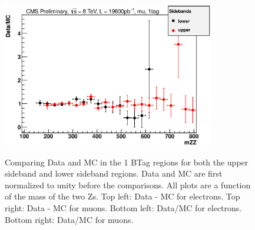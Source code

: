 \begin{figure}[htb!]
{\includegraphics[height=2.5in]{Systematics/plots/divide_mu_2_1}
\\
}
\caption{Comparing Data and MC in the 1 BTag regions for both the upper sideband and lower sideband regions. Data and MC are first normalized to unity before the comparisons. All plots are a function of the mass of the two Zs. Top left: Data - MC for electrons.  Top right: Data - MC for muons.  Bottom left: Data/MC for electrons.  Bottom right: Data/MC for muons.
\label{fig:1tag_sideband_up_down}}  
\end{figure}
